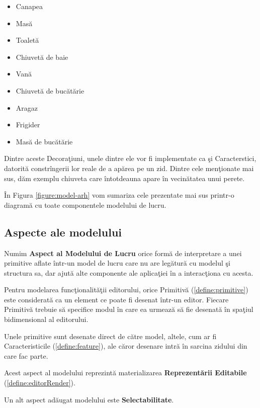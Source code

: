 \begin{itemize}
  \item Canapea
  \item Masă
  \item Toaletă
  \item Chiuvetă de baie
  \item Vană
  \item Chiuvetă de bucătărie
  \item Aragaz
  \item Frigider
  \item Masă de bucătărie
\end{itemize}

Dintre aceste Decoraţiuni, unele dintre ele vor fi implementate ca şi 
Caracterstici, datorită constrîngerii lor reale de a apărea pe un zid. Dintre 
cele menţionate mai sus, dăm exemplu chiuveta care întotdeauna apare în 
vecinătatea unui perete.

În Figura \ref{figure:model-arh} vom sumariza cele prezentate mai sus printr-o 
diagramă cu toate componentele modelului de lucru.

\subsection{Aspecte ale modelului}

\begin{definition}
\label{define:model-aspect}
Numim \textbf{Aspect al Modelului de Lucru} orice formă de interpretare a unei 
primitive aflate într-un model de lucru care nu are legătură cu modelul şi 
structura sa, dar ajută alte componente ale aplicaţiei în a interacţiona cu 
acesta.
\end{definition}

Pentru modelarea funcţionalităţii editorului, orice Primitivă 
(\ref{define:primitive}) este considerată ca un element ce poate fi desenat 
într-un editor. Fiecare Primitivă trebuie să specifice modul în care ea urmează 
să fie desenată în spaţiul bidimensional al editorului.

Unele primitive sunt desenate direct de către model, altele, cum ar fi 
Caracteristicile (\ref{define:feature}), ale căror desenare intră în 
sarcina zidului din care fac parte.

Acest aspect al modelului reprezintă materializarea \textbf{Reprezentării 
Editabile} (\ref{define:editorRender}).

Un alt aspect adăugat modelului este \textbf{Selectabilitate}.

